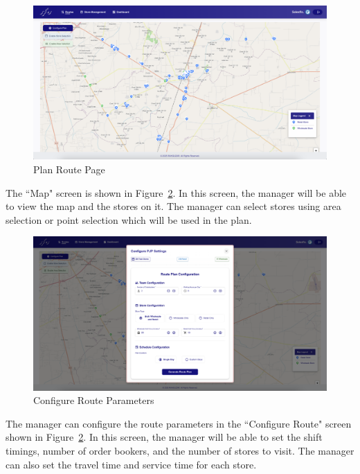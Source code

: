 \begin{figure}[H]
    \centering
    \includegraphics[width=1\textwidth]{images/Map.png} %
    \caption{Plan Route Page}
    \label{fig:image4}
\end{figure}
The ``Map" screen is shown in Figure~\ref{fig:image4}. In this screen, the manager will be able to view the map and the stores on it. The manager can select stores using area selection or point selection which will be used in the plan.


\begin{figure}[H]
    \centering
    \includegraphics[width=1\textwidth]{images/Configure.png} %
    \caption{Configure Route Parameters}
    \label{fig:image4}
\end{figure}
The manager can configure the route parameters in the ``Configure Route" screen shown in Figure~\ref{fig:image4}. In this screen, the manager will be able to set the shift timings, number of order bookers, and the number of stores to visit. The manager can also set the travel time and service time for each store.

